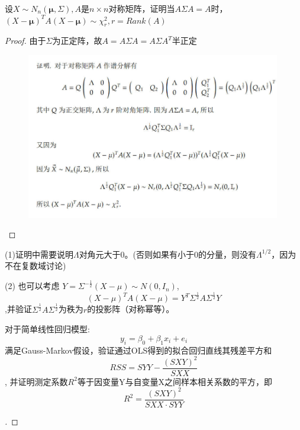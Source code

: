 \documentclass[cn,hazy,green,12pt,normal]{elegantnote}
\numberwithin{equation}{section}
\numberwithin{subsection}{section}
\begin{document}
\begin{homework}
    设$X\sim N_n(\bm \mu, \Sigma),A$是$n\times n$对称矩阵，证明当$A\Sigma A=A$时，$(X-\bm \mu )^TA(X-\bm \mu)\sim \chi_r^2,r=Rank(A)$
\end{homework}
\begin{proof}
    由于$\Sigma$为正定阵，故$A=A\Sigma A=A\Sigma A^T$半正定
    \newpage
    \begin{figure}[!htbp]
        \centering
        \includegraphics[width=30em]{image/ex1_plt2.png}
    \end{figure}
    
\end{proof}
\begin{note}
    (1)证明中需要说明$\Lambda$对角元大于0。(否则如果有小于0的分量，则没有$\Lambda^{1/2}$，因为不在复数域讨论)

    \noindent (2) 也可以考虑
    $Y=\Sigma^{-\frac{1}{2}}(X-\mu)\sim N(0,I_n)$,\[
    (X-\mu)^TA(X-\mu)=Y^T\Sigma^{\frac{1}{2}}A\Sigma^{\frac{1}{2}}Y\]
    ,并验证$\Sigma^{\frac{1}{2}}A\Sigma^{\frac{1}{2}}$为秩为$r$的投影阵（对称幂等）。
\end{note}
\newpage
\begin{homework}
    对于简单线性回归模型:
    \[y_i=\beta_0+\beta_1x_i+e_i\]满足Gauss-Markov假设，验证通过OLS得到的拟合回归直线其残差平方和
    \[RSS=SYY-\dfrac{(SXY)^2}{SXX}\],
    并证明测定系数$R^2$等于因变量Y与自变量X之间样本相关系数的平方，即
    \[R^2=\dfrac{(SXY)^2}{SXX\cdot SYY}\]
\end{homework}
\begin{proof}[\solutionname]
\end{proof}
\end{document}
